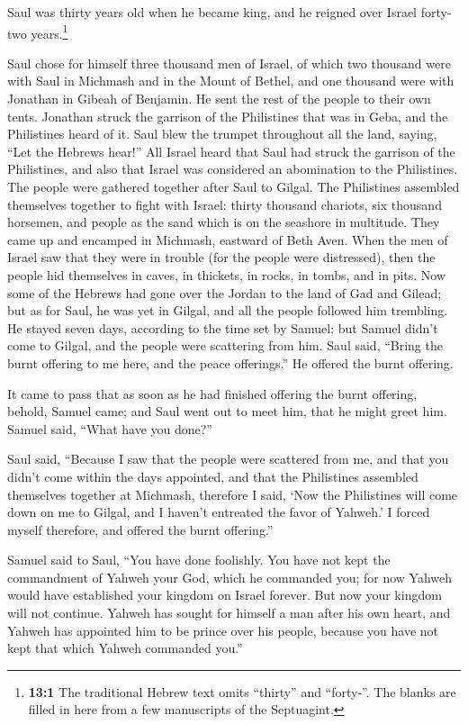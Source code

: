  Saul was thirty years old when he became king, and he
reigned over Israel forty-two years.\footnote{\textbf{13:1} The
  traditional Hebrew text omits ``thirty'' and ``forty-''. The blanks
  are filled in here from a few manuscripts of the Septuagint.}

 Saul chose for himself three thousand men of Israel, of
which two thousand were with Saul in Michmash and in the Mount of
Bethel, and one thousand were with Jonathan in Gibeah of Benjamin. He
sent the rest of the people to their own tents.  Jonathan
struck the garrison of the Philistines that was in Geba, and the
Philistines heard of it. Saul blew the trumpet throughout all the land,
saying, ``Let the Hebrews hear!''  All Israel heard that
Saul had struck the garrison of the Philistines, and also that Israel
was considered an abomination to the Philistines. The people were
gathered together after Saul to Gilgal.  The Philistines
assembled themselves together to fight with Israel: thirty thousand
chariots, six thousand horsemen, and people as the sand which is on the
seashore in multitude. They came up and encamped in Michmash, eastward
of Beth Aven.  When the men of Israel saw that they were
in trouble (for the people were distressed), then the people hid
themselves in caves, in thickets, in rocks, in tombs, and in pits.
 Now some of the Hebrews had gone over the Jordan to the
land of Gad and Gilead; but as for Saul, he was yet in Gilgal, and all
the people followed him trembling.  He stayed seven days,
according to the time set by Samuel; but Samuel didn't come to Gilgal,
and the people were scattering from him.  Saul said,
``Bring the burnt offering to me here, and the peace offerings.'' He
offered the burnt offering.

 It came to pass that as soon as he had finished offering
the burnt offering, behold, Samuel came; and Saul went out to meet him,
that he might greet him.  Samuel said, ``What have you
done?''

Saul said, ``Because I saw that the people were scattered from me, and
that you didn't come within the days appointed, and that the Philistines
assembled themselves together at Michmash,  therefore I
said, `Now the Philistines will come down on me to Gilgal, and I haven't
entreated the favor of Yahweh.' I forced myself therefore, and offered
the burnt offering.''

 Samuel said to Saul, ``You have done foolishly. You have
not kept the commandment of Yahweh your God, which he commanded you; for
now Yahweh would have established your kingdom on Israel forever.
 But now your kingdom will not continue. Yahweh has
sought for himself a man after his own heart, and Yahweh has appointed
him to be prince over his people, because you have not kept that which
Yahweh commanded you.''

